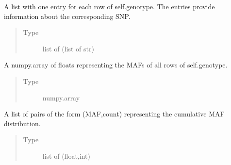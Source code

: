 \documentclass[a4paper,10pt,english]{sphinxhowto}
\begin{document}
\begin{fulllineitems}
\begin{fulllineitems}
\label{\detokenize{utils:utils.genotype_corpus_generator.GenotypeCorpusGenerator.snps}}
A list with one entry for each row of self.genotype. The entries provide information
about the corresponding SNP.
\begin{quote}\begin{description}
\item[{Type}] \leavevmode
list of (list of str)

\end{description}\end{quote}

\end{fulllineitems}


\begin{fulllineitems}
\label{\detokenize{utils:utils.genotype_corpus_generator.GenotypeCorpusGenerator.mafs}}
A numpy.array of floats representing the MAFs of all rows of self.genotype.
\begin{quote}\begin{description}
\item[{Type}] \leavevmode
numpy.array

\end{description}\end{quote}

\end{fulllineitems}


\begin{fulllineitems}
\label{\detokenize{utils:utils.genotype_corpus_generator.GenotypeCorpusGenerator.cum_mafs}}
A list of pairs of the form (MAF,count) representing the cumulative MAF distribution.
\begin{quote}\begin{description}
\item[{Type}] \leavevmode
list of (float,int)

\end{description}\end{quote}


\end{fulllineitems}
\end{fulllineitems}
\end{document}
